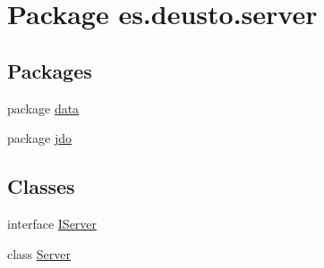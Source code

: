 \hypertarget{namespacees_1_1deusto_1_1server}{}\section{Package es.\+deusto.\+server}
\label{namespacees_1_1deusto_1_1server}
\subsection*{Packages}
\begin{DoxyCompactItemize}
\item 
package \mbox{\hyperlink{namespacees_1_1deusto_1_1server_1_1data}{data}}
\item 
package \mbox{\hyperlink{namespacees_1_1deusto_1_1server_1_1jdo}{jdo}}
\end{DoxyCompactItemize}
\subsection*{Classes}
\begin{DoxyCompactItemize}
\item 
interface \mbox{\hyperlink{interfacees_1_1deusto_1_1server_1_1_i_server}{I\+Server}}
\item 
class \mbox{\hyperlink{classes_1_1deusto_1_1server_1_1_server}{Server}}
\end{DoxyCompactItemize}
